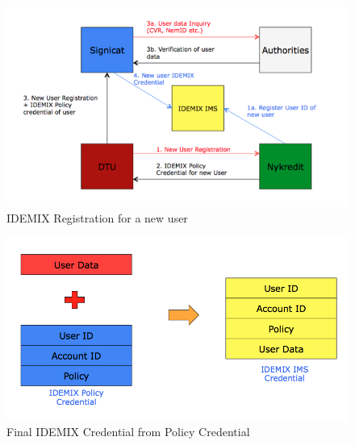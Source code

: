 \begin{figure}[h]
	\centering
	\includegraphics[width=\textwidth]{figures/IDEMIX-Real}
	\caption{IDEMIX Registration for a new user}
	\label{fig:IDEMIX-Real}
\end{figure}
\begin{figure}[h]
	\centering
	\includegraphics[width=\textwidth]{figures/Final}
	\caption{Final IDEMIX Credential from Policy Credential}
	\label{fig:Final}
\end{figure}
\FloatBarrier
